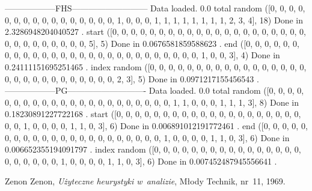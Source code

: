 \documentclass[licencjacka]{pracamgr}
\begin{document}
{\obeylines %
------------------FHS---------------------------
Data loaded. 0.0%
total random
([0, 0, 0, 0, 0, 0, 0, 0, 0, 0, 0, 0, 0, 0, 0, 0, 1, 0, 0, 0, 1, 1, 1, 1, 1, 1, 1, 1, 2, 3, 4], 18)
Done in 2.3286948204040527 .
start
([0, 0, 0, 0, 0, 0, 0, 0, 0, 0, 0, 0, 0, 0, 0, 0, 0, 0, 0, 0, 0, 0, 0, 0, 0, 0, 0, 0, 0, 0, 5], 5)
Done in 0.0676581859588623 .
end
([0, 0, 0, 0, 0, 0, 0, 0, 0, 0, 0, 0, 0, 0, 0, 0, 0, 0, 0, 0, 0, 0, 0, 0, 0, 0, 0, 1, 0, 0, 3], 4)
Done in 0.24111151695251465 .
index random
([0, 0, 0, 0, 0, 0, 0, 0, 0, 0, 0, 0, 0, 0, 0, 0, 0, 0, 0, 0, 0, 0, 0, 0, 0, 0, 0, 0, 0, 2, 3], 5)
Done in 0.0971217155456543 .
------------------PG----------------------------
Data loaded. 0.0%
total random
([0, 0, 0, 0, 0, 0, 0, 0, 0, 0, 0, 0, 0, 0, 0, 0, 0, 0, 0, 0, 0, 0, 1, 1, 0, 0, 0, 1, 1, 1, 3], 8)
Done in 0.18230891227722168 .
start
([0, 0, 0, 0, 0, 0, 0, 0, 0, 0, 0, 0, 0, 0, 0, 0, 0, 0, 0, 0, 0, 0, 1, 0, 0, 0, 0, 1, 1, 0, 3], 6)
Done in 0.006891012191772461 .
end
([0, 0, 0, 0, 0, 0, 0, 0, 0, 0, 0, 0, 0, 0, 0, 0, 0, 0, 0, 0, 0, 0, 1, 0, 0, 0, 0, 1, 1, 0, 3], 6)
Done in 0.006652355194091797 .
index random
([0, 0, 0, 0, 0, 0, 0, 0, 0, 0, 0, 0, 0, 0, 0, 0, 0, 0, 0, 0, 0, 0, 1, 0, 0, 0, 0, 1, 1, 0, 3], 6)
Done in 0.007452487945556641 .
}

\begin{thebibliography}{99}


 Zenon Zenon, \textit{Użyteczne heurystyki
    w~analizie}, Młody Technik, nr~11, 1969.

\end{thebibliography}
\end{document}
